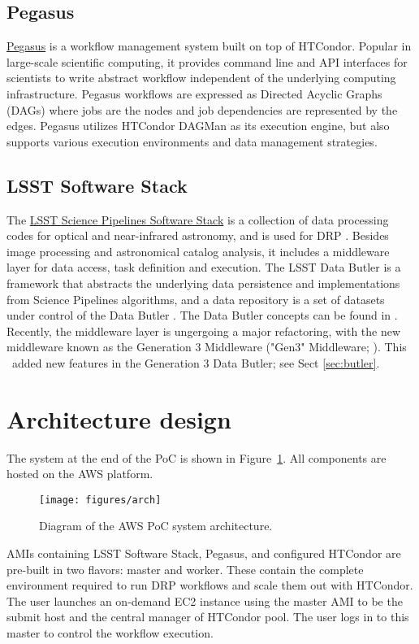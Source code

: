\subsection{Pegasus}
\href{https://pegasus.isi.edu/}{Pegasus}\citep{deelman-fgcs-2015} is a workflow management system built on top of HTCondor.
Popular in large-scale scientific computing, it provides command line and API interfaces for scientists to write abstract workflow independent of the underlying computing infrastructure.
Pegasus workflows are expressed as Directed Acyclic Graphs (DAGs) where jobs are the nodes and job dependencies are represented by the edges.
Pegasus utilizes HTCondor DAGMan as its execution engine, but also supports various execution environments and data management strategies.
\subsection{LSST Software Stack}
The \href{https://pipelines.lsst.io/}{LSST Science Pipelines Software Stack} is a collection of data processing codes for optical and near-infrared astronomy, and is used for DRP \citep{2018PASJ...70S...5B}.
Besides image processing and astronomical catalog analysis, it includes a middleware layer for data access, task definition and execution.
The LSST Data Butler is a framework that abstracts the underlying data persistence and implementations from Science Pipelines algorithms, and a data repository is a set of datasets under control of the Data Butler \citep{2018arXiv181208085J}.
The Data Butler concepts can be found in .
Recently, the middleware layer is ungergoing a major refactoring, with the new middleware known as the Generation 3 Middleware ("Gen3" Middleware; ).
This \poc~added new features in the Generation 3 Data Butler; see Sect \ref{sec:butler}.


\section{Architecture design}


The system at the end of the PoC is shown in Figure~\ref{fig:arch}.
All components are hosted on the AWS platform.

\begin{figure}
  \centering
  \texttt{[image: figures/arch]}
  \label{fig:arch}
  \caption{Diagram of the AWS PoC system architecture.}
\end{figure}

AMIs containing LSST Software Stack, Pegasus, and configured HTCondor are pre-built in two flavors: master and worker. These contain the complete environment required to run DRP workflows and scale them out with HTCondor. The user launches an on-demand EC2 instance using the master AMI to be the submit host and the central manager of HTCondor pool.
The user logs in to this master to control the workflow execution.

